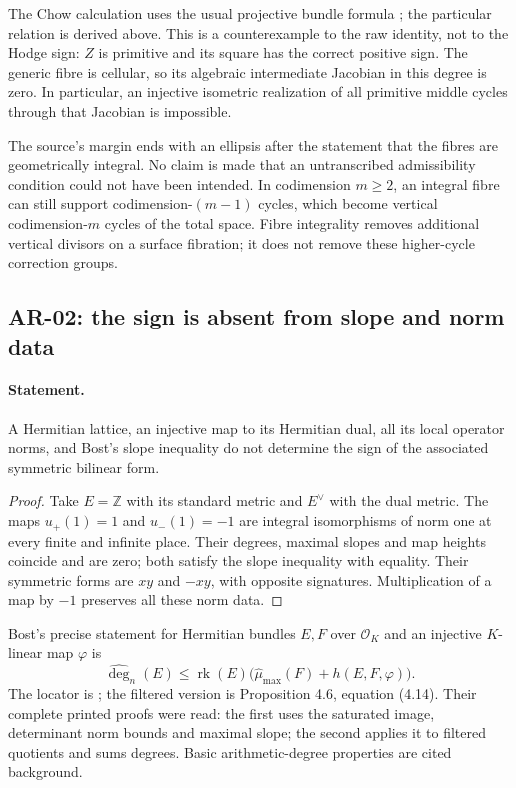 \documentclass[11pt,a4paper]{article}
\theoremstyle{remark}
\begin{document}
The Chow calculation uses the usual projective bundle formula
\cite[Theorem 3.3(b)]{Fulton}; the particular relation is derived above.
This is a counterexample to the raw identity, not to the Hodge sign:
$Z$ is primitive and its square has the correct positive sign.  The generic
fibre is cellular, so its algebraic intermediate Jacobian in this degree
is zero.  In particular, an injective isometric realization of all primitive
middle cycles through that Jacobian is impossible.

The source's margin ends with an ellipsis after the statement that the
fibres are geometrically integral.  No claim is made that an untranscribed
admissibility condition could not have been intended.  In codimension
$m\ge2$, an integral fibre can still support codimension-$(m-1)$ cycles,
which become vertical codimension-$m$ cycles of the total space.  Fibre
integrality removes additional vertical divisors on a surface fibration;
it does not remove these higher-cycle correction groups.

\subsection{AR-02: the sign is absent from slope and norm data}
\label{ar:slope-sign}

\paragraph{Statement.}
A Hermitian lattice, an injective map to its Hermitian dual, all its local
operator norms, and Bost's slope inequality do not determine the sign of
the associated symmetric bilinear form.

\begin{proof}
Take $E=\mathbb Z$ with its standard metric and $E^\vee$ with the dual
metric.  The maps $u_+(1)=1$ and $u_-(1)=-1$ are integral isomorphisms of
norm one at every finite and infinite place.  Their degrees, maximal slopes
and map heights coincide and are zero; both satisfy the slope inequality
with equality.  Their symmetric forms are $xy$ and $-xy$, with opposite
signatures.  Multiplication of a map by $-1$ preserves all these norm data.
\end{proof}

Bost's precise statement for Hermitian bundles $E,F$ over $\mathcal O_K$
and an injective $K$-linear map $\varphi$ is
\[
 \widehat{\deg}_{n}(E)
 \leq\operatorname{rk}(E)
       \bigl(\widehat\mu_{\max}(F)+h(E,F,\varphi)\bigr).
\]
The locator is \cite[\S4.1.4, Proposition 4.5, equation (4.11)]{Bost};
the filtered version is Proposition 4.6, equation (4.14).  Their complete
printed proofs were read: the first uses the saturated image, determinant
norm bounds and maximal slope; the second applies it to filtered quotients
and sums degrees.  Basic arithmetic-degree properties are cited background.
\end{document}

